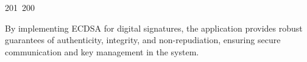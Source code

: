 201~200~\documentclass{article}
\begin{document}
	                                                                                                                                                                                                                                                                                                	                                                                                                                                        	    	                                                                                                	                                                                                                                                                                                                                                                                                                                                	                                                                        	                                                                        	                                                                                                                                        	                                                                                                                                                                                                                        	                                                                                                                            	                                                                	                                                                                        By implementing ECDSA for digital signatures, the application provides robust guarantees of authenticity, integrity, and non-repudiation, ensuring secure communication and key management in the system.
\end{document}
